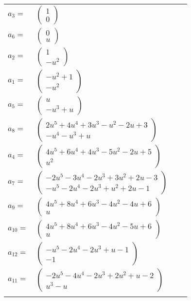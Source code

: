\documentclass[1p]{elsarticle_modified}
\theoremstyle{definition}
\begin{document}
\begin{tabular}{m{7pt} m{180pt} m{7pt} m{180pt} }
\flushright $a_{3}=$&$\begin{pmatrix}1\\0\end{pmatrix}$ \\
\flushright $a_{6}=$&$\begin{pmatrix}0\\u\end{pmatrix}$ \\
\flushright $a_{2}=$&$\begin{pmatrix}1\\- u^2\end{pmatrix}$ \\
\flushright $a_{1}=$&$\begin{pmatrix}- u^2+1\\- u^2\end{pmatrix}$ \\
\flushright $a_{5}=$&$\begin{pmatrix}u\\- u^3+u\end{pmatrix}$ \\
\flushright $a_{8}=$&$\begin{pmatrix}2 u^5+4 u^4+3 u^3- u^2-2 u+3\\- u^4- u^3+u\end{pmatrix}$ \\
\flushright $a_{4}=$&$\begin{pmatrix}4 u^5+6 u^4+4 u^3-5 u^2-2 u+5\\u^2\end{pmatrix}$ \\
\flushright $a_{7}=$&$\begin{pmatrix}-2 u^5-3 u^4-2 u^3+3 u^2+2 u-3\\- u^5-2 u^4-2 u^3+u^2+2 u-1\end{pmatrix}$ \\
\flushright $a_{9}=$&$\begin{pmatrix}4 u^5+8 u^4+6 u^3-4 u^2-4 u+6\\u\end{pmatrix}$ \\
\flushright $a_{10}=$&$\begin{pmatrix}4 u^5+8 u^4+6 u^3-4 u^2-5 u+6\\u\end{pmatrix}$ \\
\flushright $a_{12}=$&$\begin{pmatrix}- u^5-2 u^4-2 u^3+u-1\\-1\end{pmatrix}$ \\
\flushright $a_{11}=$&$\begin{pmatrix}-2 u^5-4 u^4-2 u^3+2 u^2+u-2\\u^3- u\end{pmatrix}$\\&\end{tabular}
\end{document}
